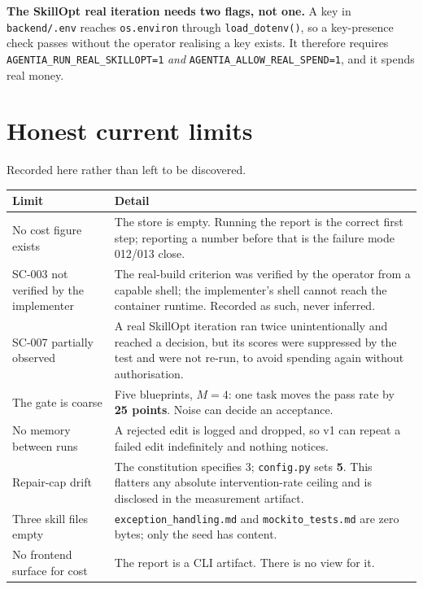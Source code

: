 \documentclass[11pt,a4paper]{article}
\begin{document}
\textbf{The SkillOpt real iteration needs two flags, not one.} A key in
\texttt{backend/.env} reaches \texttt{os.environ} through \texttt{load\_dotenv()},
so a key-presence check passes without the operator realising a key exists. It
therefore requires \texttt{AGENTIA\_RUN\_REAL\_SKILLOPT=1} \emph{and}
\texttt{AGENTIA\_ALLOW\_REAL\_SPEND=1}, and it spends real money.

\section{Honest current limits}

Recorded here rather than left to be discovered.

\begin{center}
\begin{tabular}{@{}p{}p{}@{}}
\toprule
\textbf{Limit} & \textbf{Detail} \\
\midrule
No cost figure exists & The store is empty. Running the report is the correct first
step; reporting a number before that is the failure mode 012/013 close. \\
SC-003 not verified by the implementer & The real-build criterion was verified by
the operator from a capable shell; the implementer's shell cannot reach the
container runtime. Recorded as such, never inferred. \\
SC-007 partially observed & A real SkillOpt iteration ran twice unintentionally and
reached a decision, but its scores were suppressed by the test and were not
re-run, to avoid spending again without authorisation. \\
The gate is coarse & Five blueprints, $M = 4$: one task moves the pass rate by
\textbf{25 points}. Noise can decide an acceptance. \\
No memory between runs & A rejected edit is logged and dropped, so v1 can repeat a
failed edit indefinitely and nothing notices. \\
Repair-cap drift & The constitution specifies 3; \texttt{config.py} sets
\textbf{5}. This flatters any absolute intervention-rate ceiling and is disclosed in
the measurement artifact. \\
Three skill files empty & \texttt{exception\_handling.md} and
\texttt{mockito\_tests.md} are zero bytes; only the seed has content. \\
No frontend surface for cost & The report is a CLI artifact. There is no view for
it. \\
\bottomrule
\end{tabular}
\end{center}
\end{document}
